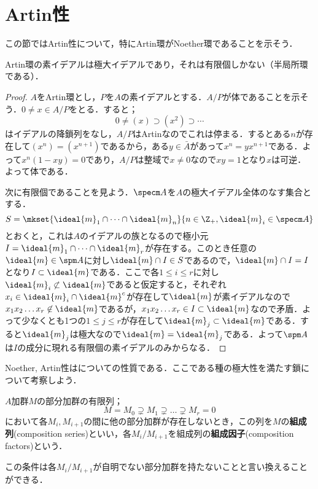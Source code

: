 \section{Artin性}

この節ではArtin性について，特にArtin環がNoether環であることを示そう．
\begin{prop}\label{prop:Artinの素イデアル}
	Artin環の素イデアルは極大イデアルであり，それは有限個しかない（半局所環である）．
\end{prop}
\begin{proof}
	$A$をArtin環とし，$P$を$A$の素イデアルとする．$A/P$が体であることを示そう．$0\neq x\in A/P$をとる．すると；
	\[0\neq(x)\supset(x^2)\supset\cdots\]
	はイデアルの降鎖列をなし，$A/P$はArtinなのでこれは停まる．するとある$n$が存在して$(x^n)=(x^{n+1})$であるから，ある$y\in\bar{A}$があって$x^n=yx^{n+1}$である．よって$x^n(1-xy)=0$であり，$A/P$は整域で$x\neq0$なので$xy=1$となり$x$は可逆．よって体である．
	
	次に有限個であることを見よう．$\specm A$を$A$の極大イデアル全体のなす集合とする．
	\[S=\mkset{\ideal{m}_1\cap\dots\cap\ideal{m}_n}{n\in\Z_+,\ideal{m}_i\in\specm A}\]
	とおくと，これは$A$のイデアルの族となるので極小元$I=\ideal{m}_1\cap\dots\cap\ideal{m}_r$が存在する。このとき任意の$\ideal{m}\in\spm A$に対し$\ideal{m}\cap I\in S$であるので，$\ideal{m}\cap I=I$となり$I\subset\ideal{m}$である．ここで各$1\leq i\leq r$に対し$\ideal{m}_i\not\subset\ideal{m}$であると仮定すると，それぞれ$x_i\in\ideal{m}_i\cap\ideal{m}^c$が存在して$\ideal{m}$が素イデアルなので$x_1x_2\dots x_r\not\in\ideal{m}$であるが，$x_1x_2\dots x_r\in I\subset\ideal{m}$なので矛盾．よって少なくとも1つの$1\leq j\leq r$が存在して$\ideal{m}_j\subset\ideal{m}$である．すると$\ideal{m}_j$は極大なので$\ideal{m}=\ideal{m}_j$である．よって$\spm A$は$I$の成分に現れる有限個の素イデアルのみからなる．
\end{proof}

Noether, Artin性はについての性質である．ここである種の極大性を満たす鎖について考察しよう．

\begin{defi}[組成列]
	$A$加群$M$の部分加群の有限列；
	\[M=M_0\supsetneq M_1\supsetneq\dots\supsetneq M_r=0\]
	において各$M_i,M_{i+1}$の間に他の部分加群が存在しないとき，この列を$M$の\textbf{組成列}(composition series)といい，各$M_i/M_{i+1}$を組成列の\textbf{組成因子}(composition factors)という．
\end{defi}

この条件は各$M_i/M_{i+1}$が自明でない部分加群を持たないことと言い換えることができる．

